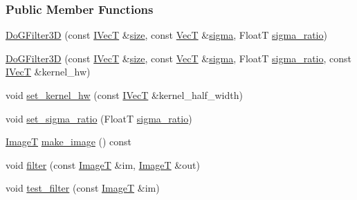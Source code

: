 \subsubsection*{Public Member Functions}
\begin{DoxyCompactItemize}
\item 
\hyperlink{classboxxer_1_1DoGFilter3D_a0e754568ce65b584b0ec5840dec90d7a}{Do\+G\+Filter3D} (const \hyperlink{classboxxer_1_1GaussFIRFilter_a0083c8c9ab6032dd458b4dc93852c2b8}{I\+VecT} \&\hyperlink{classboxxer_1_1GaussFIRFilter_ac0d4e19bb2be3e8913e77283e7e4317e}{size}, const \hyperlink{classboxxer_1_1DoGFilter3D_aea578fd16f3044b93be02a0a634c013d}{VecT} \&\hyperlink{classboxxer_1_1GaussFIRFilter_a66ced06c688fd544d5f1f8be39aa2125}{sigma}, FloatT \hyperlink{classboxxer_1_1DoGFilter3D_a91ccdf9024dd9db86ba4fc9a9651b305}{sigma\+\_\+ratio})
\item 
\hyperlink{classboxxer_1_1DoGFilter3D_ab298211a58d35286158b9c88bb498a03}{Do\+G\+Filter3D} (const \hyperlink{classboxxer_1_1GaussFIRFilter_a0083c8c9ab6032dd458b4dc93852c2b8}{I\+VecT} \&\hyperlink{classboxxer_1_1GaussFIRFilter_ac0d4e19bb2be3e8913e77283e7e4317e}{size}, const \hyperlink{classboxxer_1_1DoGFilter3D_aea578fd16f3044b93be02a0a634c013d}{VecT} \&\hyperlink{classboxxer_1_1GaussFIRFilter_a66ced06c688fd544d5f1f8be39aa2125}{sigma}, FloatT \hyperlink{classboxxer_1_1DoGFilter3D_a91ccdf9024dd9db86ba4fc9a9651b305}{sigma\+\_\+ratio}, const \hyperlink{classboxxer_1_1GaussFIRFilter_a0083c8c9ab6032dd458b4dc93852c2b8}{I\+VecT} \&kernel\+\_\+hw)
\item 
void \hyperlink{classboxxer_1_1DoGFilter3D_ad28ca7638596d5113bebfdd5f131747f}{set\+\_\+kernel\+\_\+hw} (const \hyperlink{classboxxer_1_1GaussFIRFilter_a0083c8c9ab6032dd458b4dc93852c2b8}{I\+VecT} \&kernel\+\_\+half\+\_\+width)
\item 
void \hyperlink{classboxxer_1_1DoGFilter3D_a78e035961c57882c339ffbe82c92adb6}{set\+\_\+sigma\+\_\+ratio} (FloatT \hyperlink{classboxxer_1_1DoGFilter3D_a91ccdf9024dd9db86ba4fc9a9651b305}{sigma\+\_\+ratio})
\item 
\hyperlink{classboxxer_1_1DoGFilter3D_ad90ef0ddf06b326066e2b62bab4e59b3}{ImageT} \hyperlink{classboxxer_1_1DoGFilter3D_aa40d4cf7b09aac4384d30af328ea00dd}{make\+\_\+image} () const 
\item 
void \hyperlink{classboxxer_1_1DoGFilter3D_a8759b7773d369748bd69045a614f1598}{filter} (const \hyperlink{classboxxer_1_1DoGFilter3D_ad90ef0ddf06b326066e2b62bab4e59b3}{ImageT} \&im, \hyperlink{classboxxer_1_1DoGFilter3D_ad90ef0ddf06b326066e2b62bab4e59b3}{ImageT} \&out)
\item 
void \hyperlink{classboxxer_1_1DoGFilter3D_a7a30c0136590787c3a9595110f888ee3}{test\+\_\+filter} (const \hyperlink{classboxxer_1_1DoGFilter3D_ad90ef0ddf06b326066e2b62bab4e59b3}{ImageT} \&im)
\end{DoxyCompactItemize}
